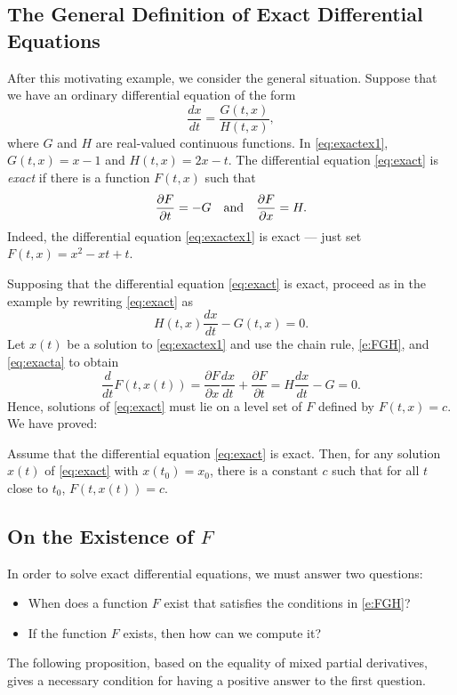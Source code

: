 \documentclass{ximera}
\begin{document}
\subsection*{The General Definition of Exact Differential Equations}

After this motivating example, we consider the general
situation.  Suppose that we have an ordinary differential
equation of the form
\begin{equation} \label{eq:exact}
\frac{dx}{dt} = \frac{G(t,x)}{H(t,x)},
\end{equation}
where $G$ and $H$ are real-valued continuous functions.  In 
\eqref{eq:exactex1}, $G(t,x)=x-1$ and $H(t,x) = 2x-t$.
The differential equation \eqref{eq:exact} is {\em exact\/} 
 if
there is a function $F(t,x)$ such that
\begin{equation}  \label{e:FGH}
\frac{\partial F}{\partial t} = -G \quad\mbox{and}\quad
\frac{\partial F}{\partial x} =  H.
\end{equation}
Indeed, the differential equation \eqref{eq:exactex1} is exact --- just set 
$F(t,x) = x^2 - xt + t$.

Supposing that the differential equation \eqref{eq:exact} is exact, proceed as 
in the example by rewriting \eqref{eq:exact} as 
\begin{equation} \label{eq:exacta}
H(t,x)\frac{dx}{dt} - G(t,x) = 0.
\end{equation}
Let $x(t)$ be a solution to \eqref{eq:exactex1} and use the chain rule, 
\eqref{e:FGH}, and \eqref{eq:exacta} to obtain
\[
\frac{d}{dt} F(t,x(t)) = \frac{\partial F}{\partial x}\frac{dx}{dt} + 
\frac{\partial F}{\partial t} = H\frac{dx}{dt}-G = 0.
\]
Hence, solutions of \eqref{eq:exact} must lie on a level set of $F$ defined 
by $F(t,x) = c$. We have proved:

\begin{theorem} \label{thm:exact}
Assume that the differential equation \eqref{eq:exact} is exact.  Then, for any 
solution $x(t)$ of \eqref{eq:exact} with $x(t_0)=x_0$, there is a constant $c$ 
such that for all $t$ close to $t_0$, $F(t,x(t)) = c$.
\end{theorem}

\subsection*{On the Existence of $F$}

In order to solve exact differential equations,
 we must answer two 
questions: 
\begin{itemize}
\item When does a function $F$ exist that satisfies the 
conditions in \eqref{e:FGH}?
\item If the function $F$ exists, then how can we compute it?
\end{itemize}
The following proposition, based on the equality of mixed partial derivatives, 
gives a necessary condition for having a positive answer to the first question.
\end{document}
